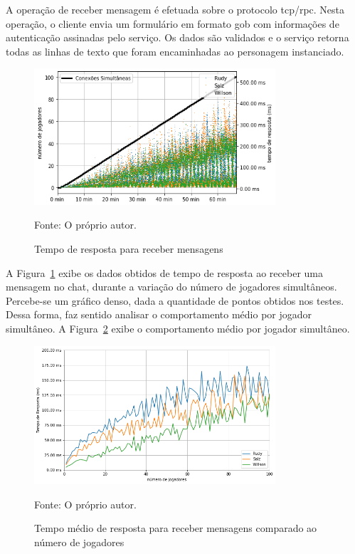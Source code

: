 A operação de receber mensagem é efetuada sobre o protocolo \ac{tcp}/\ac{rpc}.
%
Nesta operação, o cliente envia um formulário em formato \ac{gob} com informações de autenticação assinadas pelo serviço.
%
Os dados são validados e o serviço retorna todas as linhas de texto que foram encaminhadas ao personagem instanciado.

\begin{figure}[htb!]
  \caption{Tempo de resposta para receber mensagens}
  \label{fig:listen_chat_request_time}
  \includegraphics[width=0.8\textwidth]{figuras/analise/rt/listen_chat_request_time}
  \centering

  Fonte: O próprio autor.
\end{figure}

A Figura~\ref{fig:listen_chat_request_time} exibe os dados obtidos de tempo de resposta ao receber uma mensagem no chat, durante a variação do número de jogadores simultâneos.
%
Percebe-se um gráfico denso, dada a quantidade de pontos obtidos nos testes.
%
Dessa forma, faz sentido analisar o comportamento médio por jogador simultâneo.
%
A Figura~\ref{fig:listen_chat_request_time_per_concurrency} exibe o comportamento médio por jogador simultâneo.

\begin{figure}[htb!]
  \caption{Tempo médio de resposta para receber mensagens comparado ao número de jogadores}
  \label{fig:listen_chat_request_time_per_concurrency}
  \includegraphics[width=0.8\textwidth]{figuras/analise/rt/listen_chat_request_time_per_concurrency}
  \centering

  Fonte: O próprio autor.
\end{figure}

